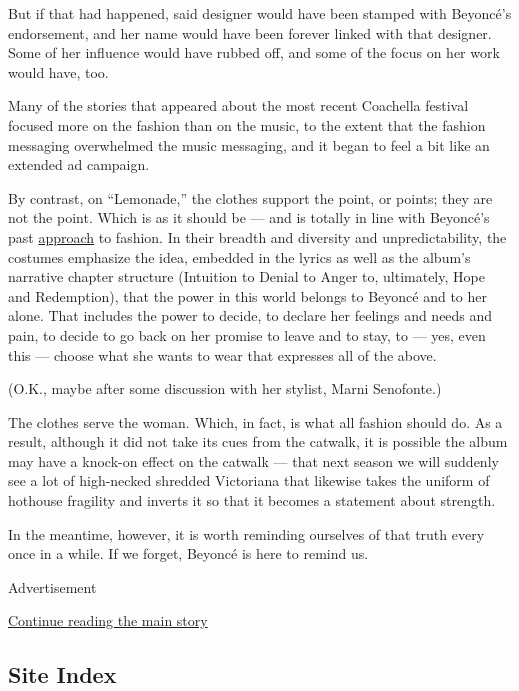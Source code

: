 But if that had happened, said designer would have been stamped with
Beyoncé's endorsement, and her name would have been forever linked with
that designer. Some of her influence would have rubbed off, and some of
the focus on her work would have, too.

Many of the stories that appeared about the most recent Coachella
festival focused more on the fashion than on the music, to the extent
that the fashion messaging overwhelmed the music messaging, and it began
to feel a bit like an extended ad campaign.

By contrast, on ``Lemonade,'' the clothes support the point, or points;
they are not the point. Which is as it should be --- and is totally in
line with Beyoncé's past
\href{http://www.nytimes.com/2014/07/31/fashion/beyonce-discounts-the-fashion-icon.html}{approach}
to fashion. In their breadth and diversity and unpredictability, the
costumes emphasize the idea, embedded in the lyrics as well as the
album's narrative chapter structure (Intuition to Denial to Anger to,
ultimately, Hope and Redemption), that the power in this world belongs
to Beyoncé and to her alone. That includes the power to decide, to
declare her feelings and needs and pain, to decide to go back on her
promise to leave and to stay, to --- yes, even this --- choose what she
wants to wear that expresses all of the above.

(O.K., maybe after some discussion with her stylist, Marni Senofonte.)

The clothes serve the woman. Which, in fact, is what all fashion should
do. As a result, although it did not take its cues from the catwalk, it
is possible the album may have a knock-on effect on the catwalk --- that
next season we will suddenly see a lot of high-necked shredded
Victoriana that likewise takes the uniform of hothouse fragility and
inverts it so that it becomes a statement about strength.

In the meantime, however, it is worth reminding ourselves of that truth
every once in a while. If we forget, Beyoncé is here to remind us.

Advertisement

\protect\hyperlink{after-bottom}{Continue reading the main story}

\hypertarget{site-index}{%
\subsection{Site Index}\label{site-index}}


